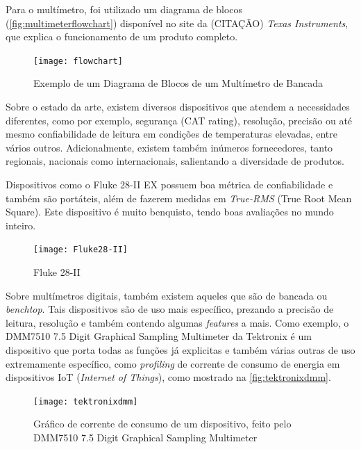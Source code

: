 Para o multímetro, foi utilizado um diagrama de blocos (\autoref{fig:multimeterflowchart}) disponível no site da (CITAÇÃO) \textit{Texas Instruments}, que explica o funcionamento de um produto completo.

\begin{figure}[h]%
    \caption{Exemplo de um Diagrama de Blocos de um Multímetro de Bancada}%
    \label{fig:multimeterflowchart}%
    \texttt{[image: flowchart]}%
\end{figure}

Sobre o estado da arte, existem diversos dispositivos que atendem a necessidades diferentes, como por exemplo, segurança (CAT rating), resolução, precisão ou até mesmo confiabilidade de leitura em condições de temperaturas elevadas, entre vários outros. Adicionalmente, existem também inúmeros fornecedores, tanto regionais, nacionais como internacionais, salientando a diversidade de produtos.

Dispositivos como o Fluke 28-II EX possuem boa métrica de confiabilidade e também são portáteis, além de fazerem medidas em \textit{True-RMS} (True Root Mean Square). Este dispositivo é muito benquisto, tendo boas avaliações no mundo inteiro.

\begin{figure}[htb]%
    \caption{Fluke 28-II}%
    \label{fig:Fluke28-II}%
    \texttt{[image: Fluke28-II]}%
\end{figure}

Sobre multímetros digitais, também existem aqueles que são de bancada ou \textit{benchtop}. Tais dispositivos são de uso mais específico, prezando a precisão de leitura, resolução e também contendo algumas \textit{features} a mais. Como exemplo, o DMM7510 7.5 Digit Graphical Sampling Multimeter da Tektronix é um dispositivo que porta todas as funções já explicitas e também várias outras de uso extremamente específico, como \textit{profiling} de corrente de consumo de energia em dispositivos \gls{IoT} (\textit{Internet of Things}), como mostrado na \autoref{fig:tektronixdmm}.

\begin{figure}[htb]%
    \caption{Gráfico de corrente de consumo de um dispositivo, feito pelo DMM7510 7.5 Digit Graphical Sampling Multimeter}%
    \label{fig:tektronixdmm}%
    \texttt{[image: tektronixdmm]}%
\end{figure}

